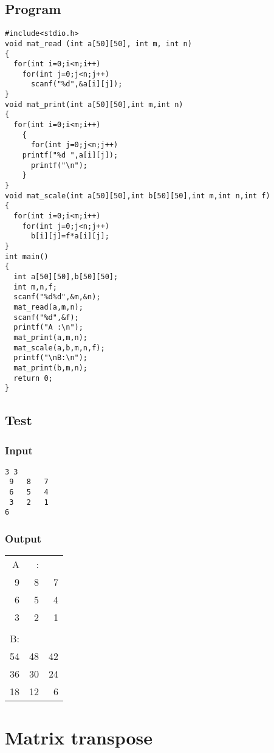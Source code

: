 \documentclass[11pt]{article}
\begin{document}
\subsection*{Program}
\label{sec-6-3}
\begin{verbatim}
#include<stdio.h>
void mat_read (int a[50][50], int m, int n)
{
  for(int i=0;i<m;i++)
    for(int j=0;j<n;j++)
      scanf("%d",&a[i][j]);
}
void mat_print(int a[50][50],int m,int n)
{
  for(int i=0;i<m;i++)
    {
      for(int j=0;j<n;j++)
	printf("%d ",a[i][j]);
      printf("\n");
    }
}
void mat_scale(int a[50][50],int b[50][50],int m,int n,int f)
{
  for(int i=0;i<m;i++)
    for(int j=0;j<n;j++)
      b[i][j]=f*a[i][j];
}
int main()
{
  int a[50][50],b[50][50];
  int m,n,f;
  scanf("%d%d",&m,&n);
  mat_read(a,m,n);
  scanf("%d",&f);
  printf("A :\n");
  mat_print(a,m,n);
  mat_scale(a,b,m,n,f);
  printf("\nB:\n");
  mat_print(b,m,n);
  return 0;
}
\end{verbatim}
\subsection*{Test}
\label{sec-6-4}
\subsubsection*{Input}
\label{sec-6-4-1}
\begin{verbatim}
3 3
 9   8   7
 6   5   4
 3   2   1
6
\end{verbatim}

\subsubsection*{Output}
\label{sec-6-4-2}
\begin{center}
\begin{tabular}{rrr}
A & : & \\
9 & 8 & 7\\
6 & 5 & 4\\
3 & 2 & 1\\
 &  & \\
B: &  & \\
54 & 48 & 42\\
36 & 30 & 24\\
18 & 12 & 6\\
\end{tabular}
\end{center}

\section{Matrix transpose}
\label{sec-7}
\end{document}
